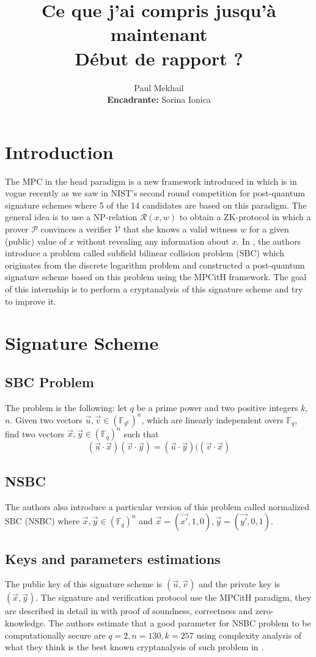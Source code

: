 \documentclass[english]{article}
\author{Paul Mekhail\\ \textbf{Encadrante:} Sorina Ionica}
\title{Ce que j'ai compris jusqu'à maintenant\\Début de rapport ?}
\begin{document}
	\maketitle
	
	\section{Introduction}
		The MPC in the head paradigm is a new framework introduced in \cite{IKOS07} which is in vogue recently as we saw in NIST's second round competition for post-quantum signature schemes where 5 of the 14 candidates are based on this paradigm.
		The general idea is to use a NP-relation $\mathcal{R}(x, w)$ to obtain a ZK-protocol in which a prover $\mathcal{P}$ convinces a verifier $\mathcal{V}$ that she knows a valid witness $w$ for a given (public) value of $x$ without revealing any information about $x$.
		In \cite{HJ23}, the authors introduce a problem called subfield bilinear collision problem (SBC) which originates from the discrete logarithm problem and constructed a post-quantum signature scheme based on this problem using the MPCitH framework.
		The goal of this internship is to perform a cryptanalysis of this signature scheme and try to improve it.
		
		\section{Signature Scheme}
		\subsection{SBC Problem}
		The problem is the following: let $q$ be a prime power and two positive integers $k$, $n$.
		\newline
		Given two vectors $\vec{u}, \vec{v} \in (\mathbb{F}_{q^k})^n$, which are linearly independent overs $\mathbb{F}_q$, find two vectors $\vec{x}, \vec{y} \in (\mathbb{F}_q)^n$ such that $$(\vec{u} \cdot \vec{x})(\vec{v} \cdot \vec{y}) = (\vec{u} \cdot \vec{y})((\vec{v} \cdot \vec{x})$$
		
		\subsection{NSBC}
		The authors also introduce a particular version of this problem called normalized SBC (NSBC) where $\vec{x}, \vec{y} \in (\mathbb{F}_q)^n$ and
		$\vec{x} = (\vec{x'}, 1, 0), \vec{y} = (\vec{y'}, 0, 1)$.
 		
 		\subsection{Keys and parameters estimations}
		The public key of this signature scheme is $(\vec{u},\vec{v})$ and the private key is $(\vec{x}, \vec{y})$.
		The signature and verification protocol use the MPCitH paradigm, they are described in detail in \cite{HJ23} with proof of soundness, correctness and zero-knowledge.
		The authors estimate that a good parameter for NSBC problem to be computationally secure are $q = 2, n = 130, k = 257$ using complexity analysis of what they think is the best known cryptanalysis of such problem in \cite{FSS11}.
		
\end{document}
